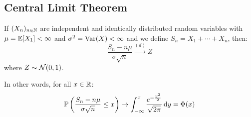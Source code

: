 \documentclass[../main.tex]{subfiles}
\begin{document}
\subsection{Central Limit Theorem}
\begin{theorem}
  If $(X_n)_{n \in \mathbb{N}}$ are independent and identically distributed random variables with $\mu = \mathbb{E}[X_1] < \infty$ and $\sigma^2 = \operatorname{Var}(X) < \infty$ and we define $S_n = X_1 + \cdots + X_n$, then: \label{CLT}
  \[
    \frac{S_n - n\mu}{\sigma \sqrt{n}} \xrightarrow{(d)} Z
  \]
  where $Z \sim \operatorname{\mathcal{N}}(0, 1)$.

  In other words, for all $x \in \mathbb{R}$:
  \[
    \P\left(\frac{S_n - n\mu}{\sigma \sqrt{n}} \leq x\right) \to \int_{-\infty}^{x} \frac{e^{-\frac{y^2}{2}}}{\sqrt{2\pi}} \d{y} = \Phi(x)
  \]
\end{theorem}
\end{document}
